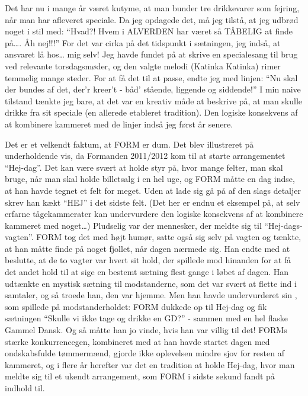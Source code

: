 Det har nu i mange år været kutyme, at man bunder tre drikkevarer som fejring, når man har afleveret speciale. Da jeg opdagede det, må jeg tilstå, at jeg udbrød noget i stil med: “Hvad?! Hvem i ALVERDEN har været så TÅBELIG at finde på…. Åh nej!!!” For det var cirka på det tidspunkt i sætningen, jeg indså, at ansvaret lå hos… mig selv! Jeg havde fundet på at skrive en specialesang til brug ved relevante torsdagsmøder, og den valgte melodi (Katinka Katinka) rimer temmelig mange steder. For at få det til at passe, endte jeg med linjen: “Nu skal der bundes af det, der’r kreer’t - båd’ stående, liggende og siddende!” I min naive tilstand tænkte jeg bare, at det var en kreativ måde at beskrive på, at man skulle drikke fra sit speciale (en allerede etableret tradition). Den logiske konsekvens af at kombinere kammeret med de linjer indså jeg først år senere.

Det er et velkendt faktum, at FORM er dum. Det blev illustreret på underholdende vis, da Formanden 2011/2012 kom til at starte arrangementet “Hej-dag”. Det kan være svært at holde styr på, hvor mange felter, man skal bruge, når man skal holde billetsalg i en hel uge, og FORM måtte en dag indse, at han havde tegnet et felt for meget. Uden at lade sig gå på af den slags detaljer skrev han kækt “HEJ” i det sidste felt. (Det her er endnu et eksempel på, at selv erfarne tågekammerater kan undervurdere den logiske konsekvens af at kombinere kammeret med noget…) Pludselig var der mennesker, der meldte sig til “Hej-dags-vagten”. FORM tog det med højt humør, satte også sig selv på vagten og tænkte, at han måtte finde på noget fjollet, når dagen nærmede sig. Han endte med at beslutte, at de to vagter var hvert sit hold, der spillede mod hinanden for at få det andet hold til at sige en bestemt sætning flest gange i løbet af dagen. Han udtænkte en mystisk sætning til modstanderne, som det var svært at flette ind i samtaler, og så troede han, den var hjemme. Men han havde undervurderet sin \KASS{}, som spillede på modstanderholdet: FORM dukkede op til Hej-dag og fik sætningen “Skulle vi ikke tage og drikke en GD?” - sammen med en hel flaske Gammel Dansk. Og så måtte han jo vinde, hvis han var villig til det! FORMs stærke konkurrencegen, kombineret med at han havde startet dagen med ondskabsfulde tømmermænd, gjorde ikke oplevelsen mindre sjov for resten af kammeret, og i flere år herefter var det en tradition at holde Hej-dag, hvor man meldte sig til et ukendt arrangement, som FORM i sidste sekund fandt på indhold til.

